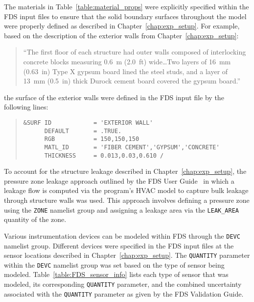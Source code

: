 \FloatBarrier
The materials in Table~\ref{table:material_props} were explicitly specified within the FDS input files to ensure that the solid boundary surfaces throughout the model were properly defined as described in Chapter~\ref{chap:exp_setup}. For example, based on the description of the exterior walls from Chapter~\ref{chap:exp_setup}:  
\begin{quote}
``The first floor of each structure had outer walls composed of interlocking concrete blocks measuring 0.6~m (2.0~ft) wide\ldots Two layers of 16~mm (0.63~in) Type X gypsum board lined the steel studs, and a layer of 13~mm (0.5~in) thick Durock cement board covered the gypsum board.''
\end{quote}
the surface of the exterior walls were defined in the FDS input file by the following lines:
\begin{quote}
\begin{verbatim}
&SURF ID            = 'EXTERIOR WALL'
      DEFAULT       = .TRUE.
      RGB           = 150,150,150
      MATL_ID       = 'FIBER CEMENT','GYPSUM','CONCRETE'
      THICKNESS     = 0.013,0.03,0.610 /
\end{verbatim}
\end{quote}

To account for the structure leakage described in Chapter~\ref{chap:exp_setup}, the pressure zone leakage approach outlined by the FDS User Guide~\cite{FDS_Users_Guide} in which a leakage flow is computed via the program's HVAC model to capture bulk leakage through structure walls was used. This approach involves defining a pressure zone using the \verb|ZONE| namelist group and assigning a leakage area via the \verb|LEAK_AREA| quantity of the zone.

Various instrumentation devices can be modeled within FDS through the \verb|DEVC| namelist group. Different devices were specified in the FDS input files at the sensor locations described in Chapter~\ref{chap:exp_setup}. The \verb|QUANTITY| parameter within the \verb|DEVC| namelist group was set based on the type of sensor being modeled. Table~\ref{table:FDS_sensor_info} lists each type of sensor that was modeled, its corresponding \verb|QUANTITY| parameter, and the combined uncertainty associated with the \verb|QUANTITY| parameter as given by the FDS Validation Guide.  

